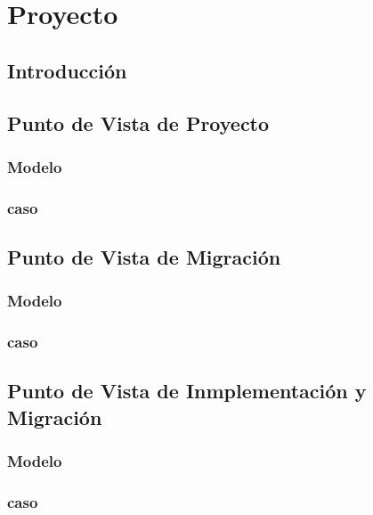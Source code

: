 \chapter{Proyecto}

\section{Introducción}

\section{Punto de Vista de Proyecto}

\subsection{Modelo}

\newpage

\subsection{caso}

\newpage

\section{Punto de Vista de Migración}

\subsection{Modelo}

\newpage

\subsection{caso}

\newpage

\section{Punto de Vista de Inmplementación y Migración}

\subsection{Modelo}

\newpage

\subsection{caso}

\newpage

